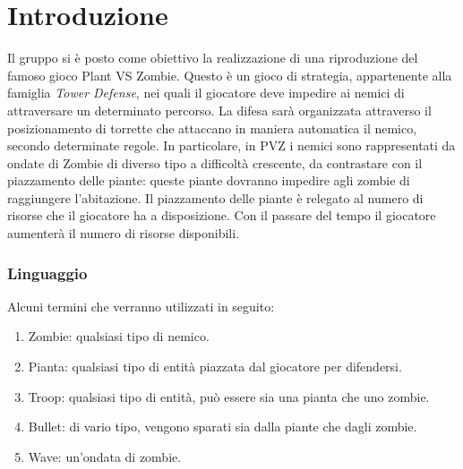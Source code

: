 \section*{Introduzione}
Il gruppo si è posto come obiettivo la realizzazione di una riproduzione del famoso gioco Plant VS Zombie.
Questo è un gioco di strategia, appartenente alla famiglia \textit{Tower Defense}, nei quali il giocatore
deve impedire ai nemici di attraversare un determinato percorso. La difesa sarà organizzata attraverso il 
posizionamento di torrette che attaccano in maniera automatica il nemico, secondo determinate regole.
In particolare, in PVZ i nemici sono rappresentati da ondate di Zombie di diverso tipo a difficoltà crescente,
da contrastare con il piazzamento delle piante: queste piante dovranno impedire agli zombie di raggiungere l'abitazione.
Il piazzamento delle piante è relegato al numero di risorse che il giocatore ha a disposizione.
Con il passare del tempo il giocatore aumenterà il numero di risorse disponibili.

\subsubsection{Linguaggio}
Alcuni termini che verranno utilizzati in seguito:
\begin{enumerate}
    \item Zombie: qualsiasi tipo di nemico.
    \item Pianta: qualsiasi tipo di entità piazzata dal giocatore per difendersi.
    \item Troop: qualsiasi tipo di entità, può essere sia una pianta che uno zombie.
    \item Bullet: di vario tipo, vengono sparati sia dalla piante che dagli zombie.
    \item Wave: un'ondata di zombie.
\end{enumerate}
